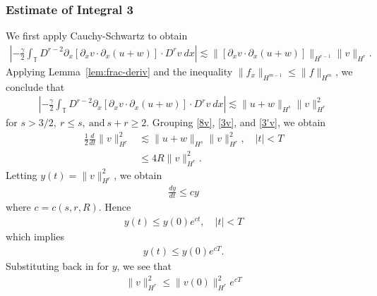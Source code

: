 \documentclass[12pt,reqno]{amsart}
\numberwithin{equation}{section}  %
\numberwithin{figure}{section}
\newcommand{\ci}{\mathbb{T}}
\newcommand{\p}{\partial}
\begin{document}
\subsubsection{Estimate of Integral 3} We first apply
Cauchy-Schwartz to obtain
%
%
\begin{equation*}
\begin{split}
\left | - \frac{\gamma}{2} \int_{\ci} D^{r 
-2} \p_x [ \p_x v
\cdot \p_x (u+w)]\cdot D^r v \ dx \right | 
 \lesssim 
\|[\p_x v \cdot \p_x (u+w)] \|_{H^{r -1}}
\|v\|_{H^r}.
\end{split}
\end{equation*}
%
%
Applying Lemma~\ref{lem:frac-deriv} and the inequality $\| f_{x}
\|_{H^{m-1}} \le \| f \|_{H^{m}}$,  we conclude that
%
\begin{equation}
\begin{split}
\left | - \frac{\gamma}{2} \int_{\ci} D^{r 
-2} \p_x [ \p_x v
\cdot \p_x (u+w)]\cdot D^r v \ dx \right | 
 \lesssim \|u+w \|_{H^{s}}
\|v\|_{H^r}^2
\label{3'v}
\end{split}
\end{equation}
%
%
for $s > 3/2, \ r \le s, \ \text{and} \ s + r \ge 2$.
%
%
%
%
Grouping \eqref{8v}, \eqref{3v}, and \eqref{3'v}, we obtain
%
%
\begin{equation}
\begin{split}
\frac{1}{2} \frac{d}{dt}
\|v\|_{H^r}^2
& \lesssim \|u+w\|_{H^s}
\|v\|_{H^r}^2, \quad | t | < T
\\
& \le 4R \| v \|_{H^{r}}^{2}.
\label{9v}
\end{split}
\end{equation}
%
%
%
%
%
Letting $y(t) = \| v \|^{2}_{H^{r}}$, we obtain
%
%
%
\begin{equation*}
\begin{split}
  \frac{dy}{dt} \le cy
\end{split}
\end{equation*}
%
where $c = c(s, r, R)$. Hence
%
%
\begin{equation*}
\begin{split}
  y(t) \le y(0) e^{ct}, \quad | t | < T
\end{split}
\end{equation*}
%
%
which implies
%
%
\begin{equation*}
\begin{split}
  y(t) \le y(0) e^{cT}.
\end{split}
\end{equation*}
%
%
Substituting back in for $y$, we see that
%
%
\begin{equation*}
\begin{split}
  \| v \|_{H^{r}}^{2} \le \| v(0) \|^{2}_{H^{r}} e^{cT}
\end{split}
\end{equation*}
\end{document}
